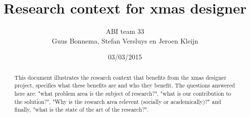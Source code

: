 \documentclass[a4paper,11pt,final]{article}
\author{ABI team 33\\
		Guus Bonnema, Stefan Versluys en Jeroen Kleijn
		}
\date{03/03/2015}
\title{\color{blue}Research context for xmas designer}
\begin{document}

\nowidow%

\newcommand{\xmas}{x\textsc{mas}}%
\newcommand{\ok}{$\checkmark$}
\newcommand{\w}[1]{\textbf{\textsc{#1}}}
\newcommand\bw[1]{{\color{blue}#1}}

\newcommand{\mybox}[1]{\begin{boxedminipage}[t]{\textwidth}#1\end{boxedminipage}}



\newcommand\smp[1]{%
	\marginpar{\color{blue}\small\bf\textsc#1}
}%
\newcommand\smpp[1]{\smp{#1}#1}


\maketitle

\begin{abstract}

	\noindent{} This document illustrates the research context
	that benefits from the xmas designer project, specifies
	what these benefits are and who they benefit. The questions
	answered here are: "what problem area is the subject of research?",
	"what is our contribution to the solution?", "Why is the research
	area relevent (socially or academically)?" and finally, "what is
	the state of the art of the research?".

\end{abstract}





\end{document}
